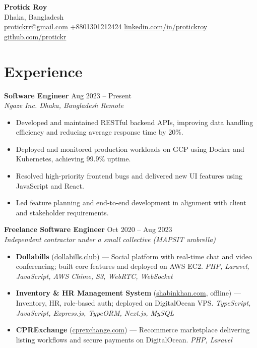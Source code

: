 \documentclass[a4paper,10pt]{article}
\begin{document}
{\LARGE \textbf{Protick Roy}}\\[-1pt]
Dhaka, Bangladesh \\
\href{mailto:protickrr@gmail.com}{protickrr@gmail.com} \textbar{} +8801301212424 \textbar{} 
\href{https://www.linkedin.com/in/protickroy}{linkedin.com/in/protickroy} \textbar{} 
\href{https://github.com/protickr}{github.com/protickr}

\vspace{6pt}

\section*{Experience}

\textbf{Software Engineer} \hfill Aug 2023 -- Present\\[-2pt]
\textit{Ngaze Inc. \textbar{} Dhaka, Bangladesh \textbar{} Remote}\\[-4pt]
\begin{itemize}
  \item Developed and maintained RESTful backend APIs, improving data handling efficiency and reducing average response time by 20\%.
  \item Deployed and monitored production workloads on GCP using Docker and Kubernetes, achieving 99.9\% uptime.
  \item Resolved high-priority frontend bugs and delivered new UI features using JavaScript and React.
  \item Led feature planning and end-to-end development in alignment with client and stakeholder requirements.
\end{itemize}

\vspace{1pt}

\textbf{Freelance Software Engineer} \hfill Oct 2020 -- Aug 2023\\[-2pt]
\textit{Independent contractor under a small collective (MAPSIT umbrella)}\\[-4pt]
\begin{itemize}
  \item \textbf{Dollabills} (\href{https://dollabills.club}{dollabills.club}) --- Social platform with real-time chat and video conferencing; built core features and deployed on AWS EC2. \emph{PHP, Laravel, JavaScript, AWS Chime, S3, WebRTC, WebSocket}
  \item \textbf{Inventory \& HR Management System} (\href{http://shabinkhan.com}{shabinkhan.com}, offline) --- Inventory, HR, role-based auth; deployed on DigitalOcean VPS. \emph{TypeScript, JavaScript, Express.js, TypeORM, Next.js, MySQL}
  \item \textbf{CPRExchange} (\href{https://cprexchange.com}{cprexchange.com}) --- Recommerce marketplace delivering listing workflows and secure payments on DigitalOcean. \emph{PHP, Laravel}
\end{itemize}
\end{document}
